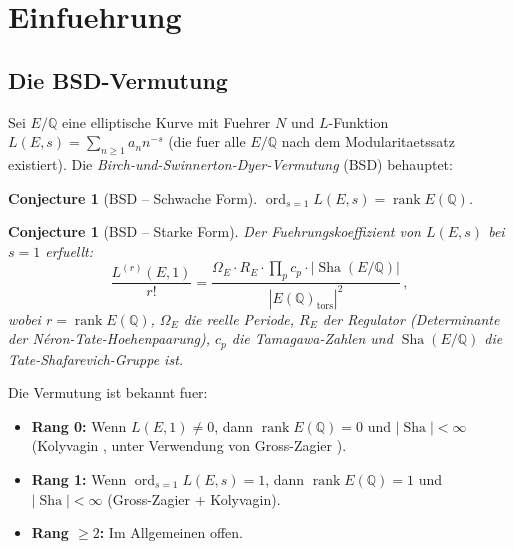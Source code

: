\documentclass[aps,prd,twocolumn,superscriptaddress,nofootinbib]{revtex4-2}
\newtheorem{conjecture}[theorem]{Conjecture}
\theoremstyle{definition}
\theoremstyle{remark}
\DeclareMathOperator{\ord}{ord}
\DeclareMathOperator{\rank}{rank}
\DeclareMathOperator{\Sha}{Sha}
\begin{document}
\section{Einfuehrung}
\label{sec:intro}

\subsection{Die BSD-Vermutung}

Sei $E/\mathbb{Q}$ eine elliptische Kurve mit Fuehrer $N$ und $L$-Funktion $L(E,s) = \sum_{n \geq 1} a_n n^{-s}$ (die fuer alle $E/\mathbb{Q}$ nach dem Modularitaetssatz \cite{Wiles1995} existiert). Die \textit{Birch-und-Swinnerton-Dyer-Vermutung} (BSD) \cite{BSD1965} behauptet:

\begin{conjecture}[BSD -- Schwache Form]
\label{conj:bsd_weak}
$\ord_{s=1} L(E,s) = \rank E(\mathbb{Q})$.
\end{conjecture}

\begin{conjecture}[BSD -- Starke Form]
\label{conj:bsd_strong}
Der Fuehrungskoeffizient von $L(E,s)$ bei $s = 1$ erfuellt:
\begin{equation}
\frac{L^{(r)}(E,1)}{r!} = \frac{\Omega_E \cdot R_E \cdot \prod_p c_p \cdot |\Sha(E/\mathbb{Q})|}{|E(\mathbb{Q})_{\mathrm{tors}}|^2}\,,
\label{eq:bsd_formula}
\end{equation}
wobei $r = \rank E(\mathbb{Q})$, $\Omega_E$ die reelle Periode, $R_E$ der Regulator (Determinante der N\'eron-Tate-Hoehenpaarung), $c_p$ die Tamagawa-Zahlen und $\Sha(E/\mathbb{Q})$ die Tate-Shafarevich-Gruppe ist.
\end{conjecture}

Die Vermutung ist bekannt fuer:
\begin{itemize}
\item \textbf{Rang 0:} Wenn $L(E,1) \neq 0$, dann $\rank E(\mathbb{Q}) = 0$ und $|\Sha| < \infty$ (Kolyvagin \cite{Kolyvagin1990}, unter Verwendung von Gross-Zagier \cite{GrossZagier1986}).
\item \textbf{Rang 1:} Wenn $\ord_{s=1} L(E,s) = 1$, dann $\rank E(\mathbb{Q}) = 1$ und $|\Sha| < \infty$ (Gross-Zagier + Kolyvagin).
\item \textbf{Rang $\geq 2$:} Im Allgemeinen offen.
\end{itemize}
\end{document}
